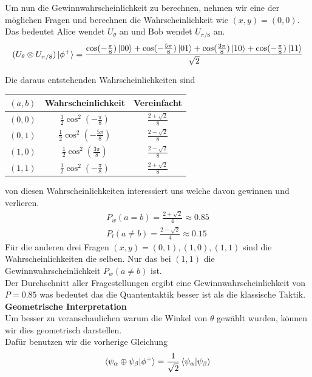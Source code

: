 Um nun die Gewinnwahrscheinlichkeit zu berechnen, nehmen wir eine der möglichen Fragen und berechnen die Wahrscheinlichkeit wie $(x, y) = (0, 0)$.\\
Das bedeutet Alice wendet $U_\theta$ an und Bob wendet $U_{\pi/8}$ an.\\

\begin{equation}
    (U_\theta \otimes U_{\pi/8})\ket{\phi^+} = \frac{\cos(-\frac{\pi}{8})\ket{00} + \cos(-\frac{5\pi}{8})\ket{01} + \cos(\frac{3\pi}{8})\ket{10} + \cos(-\frac{\pi}{8})\ket{11}}{\sqrt{2}}
\end{equation}

Die daraus entstehenden Wahrscheinlichkeiten sind

\begin{center}
    \begin{tabular}{c|c|c}
    $(a, b)$ & Wahrscheinlichkeit & Vereinfacht \\ \hline
    $(0, 0)$ & $\frac{1}{2}\cos^2(-\frac{\pi}{8})$ & $\frac{2+\sqrt{2}}{8}$ \\
    $(0, 1)$ & $\frac{1}{2}\cos^2(-\frac{5\pi}{8})$ & $\frac{2-\sqrt{2}}{8}$ \\
    $(1, 0)$ & $\frac{1}{2}\cos^2(\frac{3\pi}{8})$ & $\frac{2-\sqrt{2}}{8}$ \\
    $(1, 1)$ & $\frac{1}{2}\cos^2(-\frac{\pi}{8})$ & $\frac{2+\sqrt{2}}{8}$
    \end{tabular}
\end{center}

von diesen Wahrscheinlichkeiten interessiert uns welche davon gewinnen und verlieren. 
\begin{align}
    P_w(a = b) = \frac{2+\sqrt{2}}{4} \approx 0.85 \\
    P_l(a \neq b) = \frac{2-\sqrt{2}}{4} \approx 0.15
\end{align}
Für die anderen drei Fragen $(x, y) = (0, 1), (1, 0), (1, 1)$ sind die Wahrscheinlichkeiten die selben. Nur das bei $(1, 1)$ die Gewinnwahrscheinlichkeit $P_w(a \neq b)$ ist.\\
Der Durchschnitt aller Fragestellungen ergibt eine Gewinnwahrscheinlichkeit von $P = 0.85$ was bedeutet das die Quantentaktik besser ist als die klassische Taktik.\\

\textbf{Geometrische Interpretation}\\
Um besser zu veranschaulichen warum die Winkel von $\theta$ gewählt wurden, können wir dies geometrisch darstellen.\\
Dafür benutzen wir die vorherige Gleichung
\begin{equation}
    \braket{\psi_\alpha \oplus \psi_\beta | \phi^+} = \frac{1}{\sqrt{2}}\braket{\psi_\alpha | \psi_\beta}
\end{equation}

